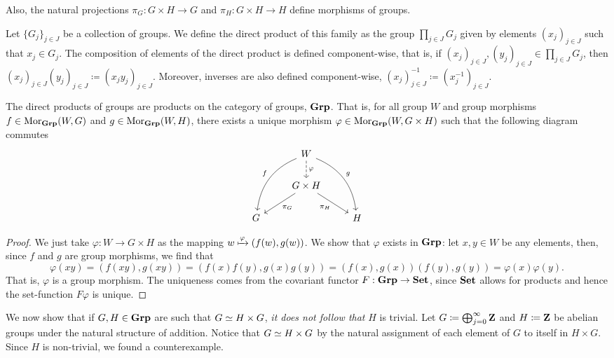 Also, the natural projections \(\pi_G: G \times H \to G\) and \(\pi_H: G \times
H \to H\) define morphisms of groups.

\begin{definition}
Let \(\{G_{j}\}_{j \in J}\) be a collection of groups. We define the direct
product of this family as the group \(\prod_{j \in J} G_j\) given by elements
\((x_j)_{j \in J}\) such that \(x_j \in G_j\). The composition of elements of
the direct product is defined component-wise, that is, if \((x_j)_{j \in J},
(y_j)_{j \in J} \in \prod_{j \in J} G_j\), then \((x_j)_{j \in J} (y_j)_{j \in
J} \coloneq (x_j y_j)_{j \in J}\). Moreover, inverses are also defined
component-wise, \((x_j)_{j \in J}^{-1} \coloneq (x_j^{-1})_{j \in J}\).
\end{definition}

\begin{proposition}
The direct products of groups are products on the category of groups,
\({\textbf{Grp}}\). That is, for all group \(W\) and group morphisms \(f \in
\operatorname{Mor}_{\textbf{Grp}}(W, G)\) and \(g \in \operatorname{Mor}_{\textbf{Grp}}(W, H)\), there exists a unique
morphism \(\varphi \in \operatorname{Mor}_{\textbf{Grp}}(W, G \times H)\) such that the following
diagram commutes
\[
  \begin{tikzcd}
    &W
    \ar[d, dashed, "\varphi"]
    \ar[ddr, bend left, "g"]
    \ar[ddl, swap, bend right, "f"]
    & \\
    &G \times H \ar[dr, swap, "\pi_H"] \ar[dl, "\pi_G"] & \\
    G & &H
  \end{tikzcd}
\]
\end{proposition}

\begin{proof}
We just take \(\varphi: W \to G \times H\) as the mapping \(w \xmapsto \varphi
(f(w), g(w))\). We show that \(\varphi\) exists in \({\textbf{Grp}}\): let \(x, y \in
W\) be any elements, then, since \(f\) and \(g\) are group morphisms, we find
that
\[
  \varphi(xy) = (f(xy), g(xy)) = (f(x) f(y), g(x) g(y))
  = (f(x), g(x)) (f(y), g(y)) = \varphi(x) \varphi(y).
\]
That is, \(\varphi\) is a group morphism. The uniqueness comes from the
covariant functor \(F: {\textbf{Grp}} \to {\textbf{Set}}\), since \({\textbf{Set}}\) allows for products and
hence the set-function \(F \varphi\) is unique.
\end{proof}

\begin{remark}
We now show that if \(G, H \in {\textbf{Grp}}\) are such that \(G \simeq H \times G\),
\emph{it does not follow that} \(H\) is trivial.
Let \(G \coloneq \bigoplus_{j=0}^{\infty} \mathbf{Z}\) and \(H \coloneq \mathbf{Z}\) be abelian
groups under the natural structure of addition. Notice that \(G \simeq H \times
G\) by the natural assignment of each element of \(G\) to itself in \(H \times
G\). Since \(H\) is non-trivial, we found a counterexample.
\end{remark}

